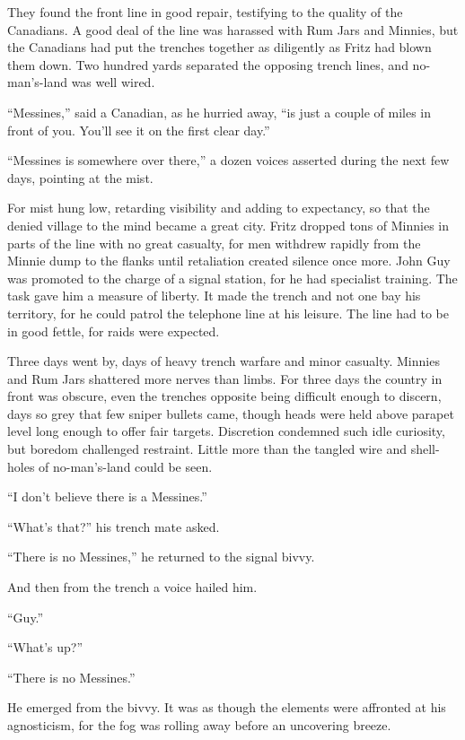 They found the front line in good repair, testifying to the quality of the Canadians. A good deal of the line was harassed with Rum Jars and Minnies, but the Canadians had put the trenches together as diligently as Fritz had blown them down. Two hundred yards separated the opposing trench lines, and no-man's-land was well wired.

``Messines,'' said a Canadian, as he hurried away, ``is just a couple of miles in front of you. You'll see it on the first clear day.''

``Messines is somewhere over there,'' a dozen voices asserted during the next few days, pointing at the mist.

For mist hung low, retarding visibility and adding to expectancy, so that the denied village to the mind became a great city. Fritz dropped tons of Minnies in parts of the line with no great casualty, for men withdrew rapidly from the Minnie dump to the flanks until retaliation created silence once more. John Guy was promoted to the charge of a signal station, for he had specialist training. The task gave him a measure of liberty. It made the trench and not one bay his territory, for he could patrol the telephone line at his leisure. The line had to be in good fettle, for raids were expected.

Three days went by, days of heavy trench warfare and minor casualty. Minnies and Rum Jars shattered more nerves than limbs. For three days the country in front was obscure, even the trenches opposite being difficult enough to discern, days so grey that few sniper bullets came, though heads were held above parapet level long enough to offer fair targets. Discretion condemned such idle curiosity, but boredom challenged restraint. Little more than the tangled wire and shell-holes of no-man's-land could be seen.

``I don't believe there is a Messines.''

``What's that?'' his trench mate asked.

``There is no Messines,'' he returned to the signal bivvy.

And then from the trench a voice hailed him.

``Guy.''

``What's up?''

``There is no Messines.''

He emerged from the bivvy. It was as though the elements were affronted at his agnosticism, for the fog was rolling away before an uncovering breeze.

